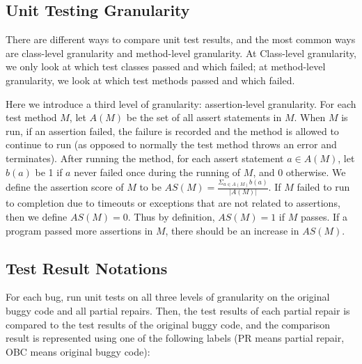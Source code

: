 \documentclass[sigconf, timestamp-false, anonymous=true]{acmart}
\begin{document}
\subsection{Unit Testing Granularity}

There are different ways to compare unit test results, and the most common ways are class-level granularity and method-level granularity. At Class-level granularity, we only look at which test classes passed and which failed; at method-level granularity, we look at which test methods passed and which failed.

Here we introduce a third level of granularity: assertion-level granularity. For each test method $M$, let $A(M)$ be the set of all assert statements in $M$. When $M$ is run, if an assertion failed, the failure is recorded and the method is allowed to continue to run (as opposed to normally the test method throws an error and terminates). After running the method, for each assert statement $a\in A(M)$, let $b(a)$ be 1 if $a$ never failed once during the running of $M$, and 0 otherwise. We define the assertion score of $M$ to be $AS(M)=\frac{\Sigma_{a\in A(M)}b(a)}{|A(M)|}$. If $M$ failed to run to completion due to timeouts or exceptions that are not related to assertions, then we define $AS(M)=0$. Thus by definition, $AS(M)=1$ if $M$ passes. If a program passed more assertions in $M$, there should be an increase in $AS(M)$.

\subsection{Test Result Notations}

For each bug, run unit tests on all three levels of granularity on the original buggy code and all partial repairs. Then, the test results of each partial repair is compared to the test results of the original buggy code, and the comparison result is represented using one of the following labels (PR means partial repair, OBC means original buggy code):
\end{document}

